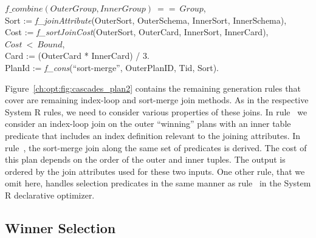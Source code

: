 \begin{figure*}
\begin{boxedminipage}{\linewidth}
\datalogspace $f\_combine(OuterGroup, InnerGroup)\ ==\ Group$, \\
\datalogspace Sort := {\em f\_joinAttribute}(OuterSort, OuterSchema, InnerSort, InnerSchema), \\
\datalogspace Cost := {\em f\_sortJoinCost}(OuterSort, OuterCard, InnerSort, InnerCard), \\
\datalogspace $Cost\ <\ Bound$, \\
\datalogspace Card := (OuterCard * InnerCard) / 3. \\
\datalogspace PlanId := {\em f\_cons}(``sort-merge'', OuterPlanID, Tid, Sort).

\end{boxedminipage}
\caption{\label{ch:opt:fig:cascades_plan2} Cascades plan generation rules for index-loop
and sort-merge join methods.}
\end{figure*}

Figure~\ref{ch:opt:fig:cascades_plan2} contains the remaining 
generation rules that cover are remaining index-loop and sort-merge join
methods.  As in the respective System R rules, we need to consider various
properties of these joins.  In rule~ we consider an index-loop join on
the outer ``winning'' plans with an inner table predicate that includes an
index definition relevant to the joining attributes.  In rule~, the
sort-merge join along the same set of predicates is derived.  The cost of this
plan depends on the order of the outer and inner tuples.  The output is ordered
by the join attributes used for these two inputs.  One other rule, that we omit
here, handles selection predicates in the same manner as rule~ in the
System R declarative optimizer.

\subsection{Winner Selection}
\label{ch:opt:sec:cascades_winner}

